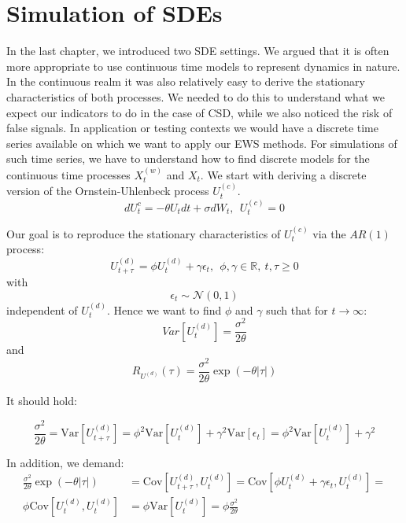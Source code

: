 \documentclass[%
thesis=student,%
coverpage=false,%
titlepage=false,%
headmarks=true, %
english,%
font=libertine, %
math=newpxtx, %
BCOR=5mm,%
coverBCOR=11mm%
]{tumbook}
\begin{document}
\chapter{Simulation of SDEs}

In the last chapter, we introduced two SDE settings. We argued that it is often more appropriate to use continuous time models to represent dynamics in nature. In the continuous realm it was also relatively easy to derive the stationary characteristics of both processes. We needed to do this to understand what we expect our indicators to do in the case of CSD, while we also noticed the risk of false signals. 
In application or testing contexts we would have a discrete time series available on which we want to apply our EWS methods. For simulations of such time series, we have to understand how to find discrete models for the continuous time processes $X_{t}^{(w)}$ and $X_{t}$. We start with deriving a discrete version of the Ornstein-Uhlenbeck process $U_{t}^{(c)}$.
\[
dU_{t}^{c} = -\theta U_{t}dt + \sigma dW_{t}, \ \ U_{t}^{(c)} = 0
\]

Our goal is to reproduce the stationary characteristics of $U_{t}^{(c)}$  via the $AR(1)$ process:
\[
     U_{t+\tau}^{(d)} = \phi U_{t} ^{(d)}+ \gamma \epsilon_{t}, \ \ \phi, \gamma \in \mathbb{R}, \ t,\tau \geq 0
\]
with 
\[
\epsilon_{t} \sim \mathcal{N}(0,1)
\]
independent of $U_{t}^{(d)}$.
Hence we want to find $\phi$ and $\gamma$ such that for $t \rightarrow \infty$:
\[
Var[U_{t}^{(d)}] = \frac{\sigma^{2}}{2\theta}
\]
and 
\[
R_{U^{(d)}}(\tau) = \frac{\sigma ^2}{2\theta}\exp(-\theta\lvert \tau \rvert)
\]

It should hold:

\begin{equation*}
    \frac{\sigma^2}{2\theta} = \text{Var}[U_{t+\tau} ^{(d)}] = \phi ^2 \text{Var}[U_{t} ^{(d)}] + \gamma ^2 \text{Var}[\epsilon_{t}] = \phi ^2 \text{Var}[U_{t} ^{(d)}] + \gamma ^2
\end{equation*}

In addition, we demand: 
  \begin{align*} 
      \frac{\sigma ^2}{2\theta}\exp(-\theta\lvert \tau \rvert) &= \text{Cov}[U_{t+\tau} ^{(d)},U_{t} ^{(d)}] = \text{Cov}[\phi U_{t} ^{(d)} + \gamma \epsilon_{t}, U_{t}^{(d)}] = \\
      \phi\text{Cov}[U_{t}^{(d)},U_{t}^{(d)}] &= \phi \text{Var}[U_{t}^{(d)}] = \phi \frac{\sigma^2}{2\theta}
  \end{align*}
\end{document}
